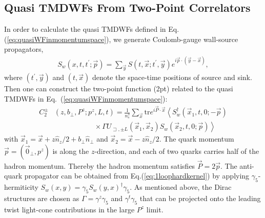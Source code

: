 \subsection{Quasi TMDWFs From Two-Point Correlators}
\label{sec:quasi-WF_from_2pt}
In order to calculate the quasi TMDWFs  defined in Eq.(\ref{eq:quasiWFinmomentumspace}), we generate Coulomb-gauge wall-source propagators, 
\begin{align}
S_{w}\left(x, t, t^{\prime} ; \vec{p}\right)=\sum_{\vec{y}} S\left(t, \vec{x} ; t^{\prime}, \vec{y}\right) e^{i \vec{p} \cdot(\vec{y}-\vec{x})}, \label{eq:wallsource}
\end{align}
where $(t^{\prime},\vec{y})$ and $(t,\vec{x})$ denote the space-time positions of source and sink. Then one  can construct the two-point function (2pt) related to the quasi TMDWFs  in Eq.~(\ref{eq:quasiWFinmomentumspace}):
\begin{align}
C_2^{\pm}&	\left(z,b_{\perp},P^z; p^z,L,t \right)=\frac{1}{n_s^3}\sum_{\vec{x}}\mathrm{tr} e^{i\vec{P}\cdot\vec{x}}\left\langle S_w^{\dagger}\left(\vec{x}_1,t,0;-\vec{p}\right)\right. \nonumber\\
&\;\;\;\;\;\;\;\;\;\; \;\;\;\;\;\;\;\;\;\;    \times \left. \Gamma U_{\sqsupset, \pm L}\left(\vec{x}_1,\vec{x}_2\right) S_w\left(\vec{x}_2,t,0;\vec{p} \right)  \right\rangle
\label{eq:nonlocal2pt}
\end{align}
with $\vec{x}_1=\vec{x}+z\hat{n}_z/2+b_{\perp}\hat{n}_{\perp}$ and  $\vec{x}_2=\vec{x}-z \hat{n}_{z}/2$. The quark momentum $\vec{p}=(\vec{0}_{\perp},p^z)$ is along the $z$-direction, and each of two quarks carries half of the hadron momentum. Thereby the hadron momentum satisfies  $\vec{P}=2\vec{p}$. The anti-quark propagator can be obtained from Eq.(\ref{eq:1loophardkernel}) by applying $\gamma_5$-hermiticity $S_w(x,y)=\gamma_5S_w(y,x)^{\dagger}\gamma_5$. As mentioned above, the Dirac structures are chosen as $\Gamma=\gamma^z\gamma_5$ and $\gamma^t\gamma_5$ that can be projected onto the leading twist light-cone contributions in the large $P^z$ limit.
 

